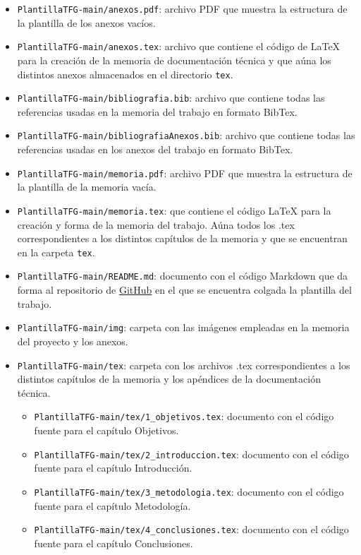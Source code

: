 \begin{itemize}
\begin{itemize}
    \item \texttt{PlantillaTFG-main/anexos.pdf}: archivo PDF que muestra la estructura de la plantilla de los anexos vacíos.
    \item \texttt{PlantillaTFG-main/anexos.tex}: archivo que contiene el código de LaTeX para la creación de la memoria de documentación técnica y que aúna los distintos anexos almacenados en el directorio \texttt{tex}.
    \item \texttt{PlantillaTFG-main/bibliografia.bib}: archivo que contiene todas las referencias usadas en la memoria del trabajo en formato BibTex.
    \item \texttt{PlantillaTFG-main/bibliografiaAnexos.bib}: archivo que contiene todas las referencias usadas en los anexos del trabajo en formato BibTex.
    \item \texttt{PlantillaTFG-main/memoria.pdf}: archivo PDF que muestra la estructura de la plantilla de la memoria vacía.
    \item \texttt{PlantillaTFG-main/memoria.tex}: que contiene el código LaTeX para la creación y forma de la memoria del trabajo. Aúna todos los .tex correspondientes a los distintos capítulos de la memoria y que se encuentran en la carpeta \texttt{tex}.
    \item \texttt{PlantillaTFG-main/README.md}: documento con el código Markdown que da forma al repositorio de \href{https://github.com/IngenieriaSaludBurgos/PlantillaTFG}{GitHub} en el que se encuentra colgada la plantilla del trabajo.
    \item \texttt{PlantillaTFG-main/img}: carpeta con las imágenes empleadas en la memoria del proyecto y los anexos.
    \item \texttt{PlantillaTFG-main/tex}: carpeta con los archivos .tex correspondientes a los distintos capítulos de la memoria y los apéndices de la documentación técnica.
    \begin{itemize}
        \item \texttt{PlantillaTFG-main/tex/1\_objetivos.tex}: documento con el código fuente para el capítulo Objetivos.
        \item \texttt{PlantillaTFG-main/tex/2\_introduccion.tex}: documento con el código fuente para el capítulo Introducción.
        \item \texttt{PlantillaTFG-main/tex/3\_metodologia.tex}: documento con el código fuente para el capítulo Metodología.
        \item \texttt{PlantillaTFG-main/tex/4\_conclusiones.tex}: documento con el código fuente para el capítulo Conclusiones.

\end{itemize}
\end{itemize}
\end{itemize}
